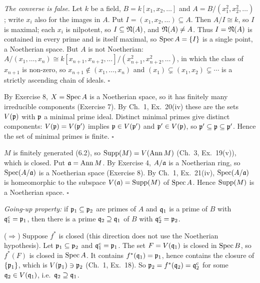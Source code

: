 \documentclass[11pt]{article}
\begin{document}
\emph{The converse is false.} Let $k$ be a field, $B=k[x_1,x_2,\dots]$ and $A=B/(x_1^2,x_2^2,\dots)$; write $x_i$ also for the images in $A$. Put $I=(x_1,x_2,\dots)\subseteq A$. Then $A/I\cong k$, so $I$ is maximal; each $x_i$ is nilpotent, so $I\subseteq\mathfrak N(A)$, and $\mathfrak N(A)\ne A$. Thus $I=\mathfrak N(A)$ is contained in every prime and is itself maximal, so $\operatorname{Spec} A=\{I\}$ is a single point, a Noetherian space. But $A$ is not Noetherian: $A/(x_1,\dots,x_n)\cong k[x_{n+1},x_{n+2},\dots]/(x_{n+1}^2,x_{n+2}^2,\dots)$, in which the class of $x_{n+1}$ is non-zero, so $x_{n+1}\notin(x_1,\dots,x_n)$ and $(x_1)\subsetneq(x_1,x_2)\subsetneq\cdots$ is a strictly ascending chain of ideals. \hfill$\square$

\pf
By Exercise 8, $X=\operatorname{Spec} A$ is a Noetherian space, so it has finitely many irreducible components (Exercise 7). By Ch.~1, Ex.~20(iv) these are the sets $V(\mathfrak p)$ with $\mathfrak p$ a minimal prime ideal. Distinct minimal primes give distinct components: $V(\mathfrak p)=V(\mathfrak p')$ implies $\mathfrak p\in V(\mathfrak p')$ and $\mathfrak p'\in V(\mathfrak p)$, so $\mathfrak p'\subseteq\mathfrak p\subseteq\mathfrak p'$. Hence the set of minimal primes is finite. \hfill$\square$

\pf
$M$ is finitely generated (6.2), so $\operatorname{Supp}(M)=V(\operatorname{Ann} M)$ (Ch.~3, Ex.~19(v)), which is closed. Put $\mathfrak a=\operatorname{Ann} M$. By Exercise 4, $A/\mathfrak a$ is a Noetherian ring, so $\operatorname{Spec}(A/\mathfrak a)$ is a Noetherian space (Exercise 8). By Ch.~1, Ex.~21(iv), $\operatorname{Spec}(A/\mathfrak a)$ is homeomorphic to the subspace $V(\mathfrak a)=\operatorname{Supp}(M)$ of $\operatorname{Spec} A$. Hence $\operatorname{Supp}(M)$ is a Noetherian space. \hfill$\square$

\pf
\emph{Going-up property:} if $\mathfrak p_1\subseteq\mathfrak p_2$ are primes of $A$ and $\mathfrak q_1$ is a prime of $B$ with $\mathfrak q_1^c=\mathfrak p_1$, then there is a prime $\mathfrak q_2\supseteq\mathfrak q_1$ of $B$ with $\mathfrak q_2^c=\mathfrak p_2$.

($\Rightarrow$) Suppose $f^*$ is closed (this direction does not use the Noetherian hypothesis). Let $\mathfrak p_1\subseteq\mathfrak p_2$ and $\mathfrak q_1^c=\mathfrak p_1$. The set $F=V(\mathfrak q_1)$ is closed in $\operatorname{Spec} B$, so $f^*(F)$ is closed in $\operatorname{Spec} A$. It contains $f^*(\mathfrak q_1)=\mathfrak p_1$, hence contains the closure of $\{\mathfrak p_1\}$, which is $V(\mathfrak p_1)\ni\mathfrak p_2$ (Ch.~1, Ex.~18). So $\mathfrak p_2=f^*(\mathfrak q_2)=\mathfrak q_2^c$ for some $\mathfrak q_2\in V(\mathfrak q_1)$, i.e.\ $\mathfrak q_2\supseteq\mathfrak q_1$.
\end{document}
